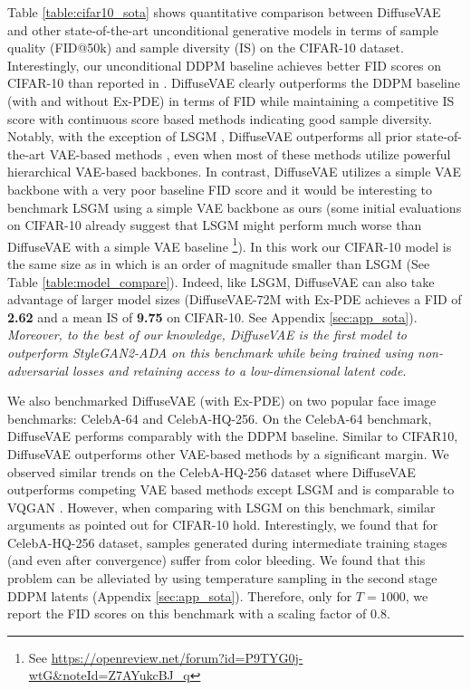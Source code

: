 \documentclass[10pt]{article} \usepackage[accepted]{tmlr}
\begin{document}
Table \ref{table:cifar10_sota} shows quantitative comparison between DiffuseVAE and other state-of-the-art unconditional generative models in terms of sample quality (FID@50k) and sample diversity (IS) on the CIFAR-10 dataset. Interestingly, our unconditional DDPM baseline achieves better FID scores on CIFAR-10 than reported in \citep{ho2020denoising}. DiffuseVAE clearly outperforms the DDPM baseline (with and without Ex-PDE) in terms of FID while maintaining a competitive IS score with continuous score based methods indicating good sample diversity. Notably, with the exception of LSGM \citep{vahdat2021scorebased}, DiffuseVAE outperforms all prior state-of-the-art VAE-based methods \citep{vahdat2021nvae,xiao2021vaebm,sinha2021d2c}, even when most of these methods utilize powerful hierarchical VAE-based backbones. In contrast, DiffuseVAE utilizes a simple VAE backbone with a very poor baseline FID score and it would be interesting to benchmark LSGM using a simple VAE backbone as ours (some initial evaluations on CIFAR-10 already suggest that LSGM might perform much worse than DiffuseVAE with a simple VAE baseline \footnote{See \url{https://openreview.net/forum?id=P9TYG0j-wtG&noteId=Z7AYukcBJ_q}}). In this work our CIFAR-10 model is the same size as in \citep{ho2020denoising} which is an order of magnitude smaller than LSGM (See Table \ref{table:model_compare}). Indeed, like LSGM, DiffuseVAE can also take advantage of larger model sizes (DiffuseVAE-72M with Ex-PDE achieves a FID of \textbf{2.62} and a mean IS of \textbf{9.75} on CIFAR-10. See Appendix \ref{sec:app_sota}). \textit{Moreover, to the best of our knowledge, DiffuseVAE is the first model to outperform StyleGAN2-ADA \citep{https://doi.org/10.48550/arxiv.2006.06676} on this benchmark while being trained using non-adversarial losses and retaining access to a low-dimensional latent code}.

We also benchmarked DiffuseVAE (with Ex-PDE) on two popular face image benchmarks: CelebA-64 and CelebA-HQ-256. On the CelebA-64 benchmark, DiffuseVAE performs comparably with the DDPM baseline. Similar to CIFAR10, DiffuseVAE outperforms other VAE-based methods \citep{sinha2021d2c, Aneja2020NCPVAEVA, xiao2021vaebm} by a significant margin. We observed similar trends on the CelebA-HQ-256 dataset where DiffuseVAE outperforms competing VAE based methods except LSGM and is comparable to VQGAN \citep{https://doi.org/10.48550/arxiv.2012.09841}. However, when comparing with LSGM on this benchmark, similar arguments as pointed out for CIFAR-10 hold. Interestingly, we found that for CelebA-HQ-256 dataset, samples generated during intermediate training stages (and even after convergence) suffer from color bleeding. We found that this problem can be alleviated by using temperature sampling in the second stage DDPM latents (Appendix \ref{sec:app_sota}). Therefore, only for $T=1000$, we report the FID scores on this benchmark with a scaling factor of 0.8.
\end{document}
